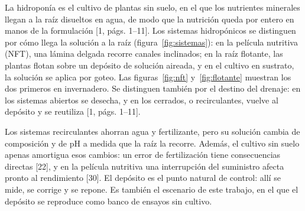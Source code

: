 La hidroponía es el cultivo de plantas sin suelo, en el que los nutrientes minerales llegan a la raíz disueltos en agua, de modo que la nutrición queda por entero en manos de la formulación [1, págs. 1–11]. Los sistemas hidropónicos se distinguen por cómo llega la solución a la raíz (figura~\ref{fig:sistemas}): en la película nutritiva (NFT), una lámina delgada recorre canales inclinados; en la raíz flotante, las plantas flotan sobre un depósito de solución aireada, y en el cultivo en sustrato, la solución se aplica por goteo. Las figuras~\ref{fig:nft} y~\ref{fig:flotante} muestran los dos primeros en invernadero. Se distinguen también por el destino del drenaje: en los sistemas abiertos se desecha, y en los cerrados, o recirculantes, vuelve al depósito y se reutiliza [1, págs. 1–11].


Los sistemas recirculantes ahorran agua y fertilizante, pero su solución cambia de composición y de pH a medida que la raíz la recorre. Además, el cultivo sin suelo apenas amortigua esos cambios: un error de fertilización tiene consecuencias directas [22], y en la película nutritiva una interrupción del suministro afecta pronto al rendimiento [30]. El depósito es el punto natural de control: allí se mide, se corrige y se repone. Es también el escenario de este trabajo, en el que el depósito se reproduce como banco de ensayos sin cultivo.

\begin{figure}[H]\centering
{}\hspace{10mm}
\end{figure}

